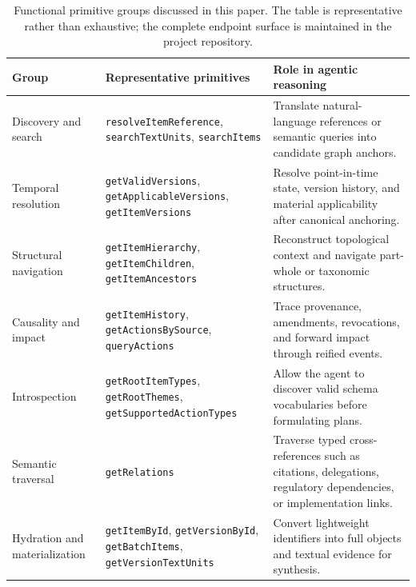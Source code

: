 \documentclass[11pt]{article}
\begin{document}
\begin{table}[!htbp]
\centering
\footnotesize
\setlength{\tabcolsep}{4pt}
\renewcommand{\arraystretch}{0.92}
\caption{Functional primitive groups discussed in this paper. The table is representative rather than exhaustive; the complete endpoint surface is maintained in the project repository.}
\label{tab:primitive_groups}
\begin{tabular}{@{}p{} p{} p{}@{}}
\toprule
\textbf{Group} & \textbf{Representative primitives} & \textbf{Role in agentic reasoning} \\
\midrule

Discovery and search &
\texttt{resolveItemReference}, \texttt{searchTextUnits}, \texttt{searchItems} &
Translate natural-language references or semantic queries into candidate graph anchors. \\

Temporal resolution &
\texttt{getValidVersions}, \texttt{getApplicableVersions}, \texttt{getItemVersions} &
Resolve point-in-time state, version history, and material applicability after canonical anchoring. \\

Structural navigation &
\texttt{getItemHierarchy}, \texttt{getItemChildren}, \texttt{getItemAncestors} &
Reconstruct topological context and navigate part-whole or taxonomic structures. \\

Causality and impact &
\texttt{getItemHistory}, \texttt{getActionsBySource}, \texttt{queryActions} &
Trace provenance, amendments, revocations, and forward impact through reified events. \\

Introspection &
\texttt{getRootItemTypes}, \texttt{getRootThemes}, \texttt{getSupportedActionTypes} &
Allow the agent to discover valid schema vocabularies before formulating plans. \\

Semantic traversal &
\texttt{getRelations} &
Traverse typed cross-references such as citations, delegations, regulatory dependencies, or implementation links. \\

Hydration and materialization &
\texttt{getItemById}, \texttt{getVersionById}, \texttt{getBatchItems}, \texttt{getVersionTextUnits} &
Convert lightweight identifiers into full objects and textual evidence for synthesis. \\

\bottomrule
\end{tabular}
\end{table}
\end{document}
